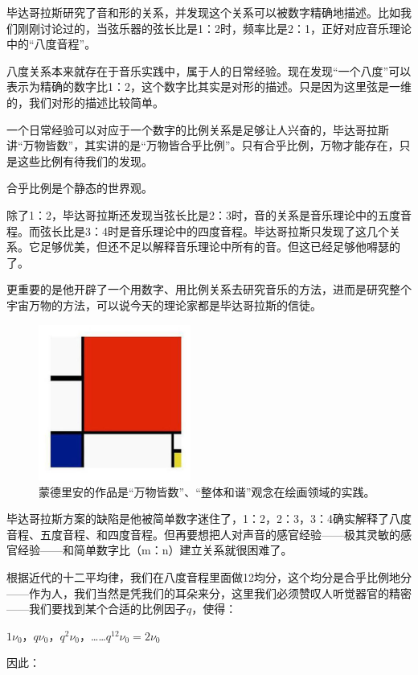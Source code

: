 毕达哥拉斯研究了音和形的关系，并发现这个关系可以被数字精确地描述。比如我们刚刚讨论过的，当弦乐器的弦长比是1：2时，频率比是2：1，正好对应音乐理论中的“八度音程”。

八度关系本来就存在于音乐实践中，属于人的日常经验。现在发现“一个八度”可以表示为精确的数字比1：2，这个数字比其实是对形的描述。只是因为这里弦是一维的，我们对形的描述比较简单。

一个日常经验可以对应于一个数字的比例关系是足够让人兴奋的，毕达哥拉斯讲“万物皆数”，其实讲的是“万物皆合乎比例”。只有合乎比例，万物才能存在，只是这些比例有待我们的发现。

合乎比例是个静态的世界观。

除了1：2，毕达哥拉斯还发现当弦长比是2：3时，音的关系是音乐理论中的五度音程。而弦长比是3：4时是音乐理论中的四度音程。毕达哥拉斯只发现了这几个关系。它足够优美，但还不足以解释音乐理论中所有的音。但这已经足够他嘚瑟的了。

更重要的是他开辟了一个用数字、用比例关系去研究音乐的方法，进而是研究整个宇宙万物的方法，可以说今天的理论家都是毕达哥拉斯的信徒。

\begin{figure}[htbp]
\begin{center}
\includegraphics[width=5cm]{Preface/colorsquare.jpg}
\caption{蒙德里安的作品是“万物皆数”、“整体和谐”观念在绘画领域的实践。}
\end{center}
\end{figure}

毕达哥拉斯方案的缺陷是他被简单数字迷住了，1：2，2：3，3：4确实解释了八度音程、五度音程、和四度音程。但再要想把人对声音的感官经验——极其灵敏的感官经验——和简单数字比（m：n）建立关系就很困难了。

根据近代的十二平均律，我们在八度音程里面做12均分，这个均分是合乎比例地分——作为人，我们当然是凭我们的耳朵来分，这里我们必须赞叹人听觉器官的精密——我们要找到某个合适的比例因子$q$，使得：

$1 \nu_0$，$q \nu_0$，$q^2 \nu_0$，……$q^{12} \nu_0 =2 \nu_0$

因此：

